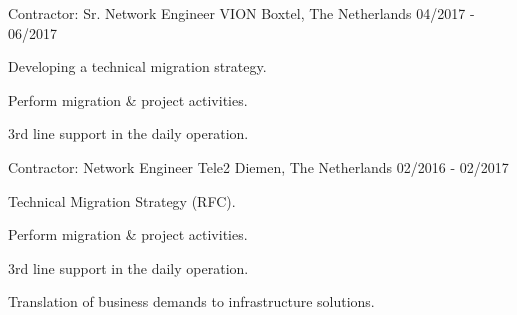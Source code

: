 \begin{cventries}
  \cventry
	{Contractor: Sr. Network Engineer} %
	{VION} %
	{Boxtel, The Netherlands} %
	{04/2017 - 06/2017} %
    {
      \begin{cvitems} %
          \item {Developing a technical migration strategy.}
	  \item {Perform migration \& project activities.}	
	  \item {3rd line support in the daily operation.}
      \end{cvitems}
    }

  \cventry
        {Contractor: Network Engineer} %
 	{Tele2} %
 	{Diemen, The Netherlands} %
  	{02/2016 - 02/2017} %
    {
      \begin{cvitems} %
          \item {Technical Migration Strategy (RFC).}
    \item {Perform migration \& project activities.}
    \item {3rd line support in the daily operation.}
    \item {Translation of business demands to infrastructure solutions.}
      \end{cvitems}
    }


\end{cventries}
